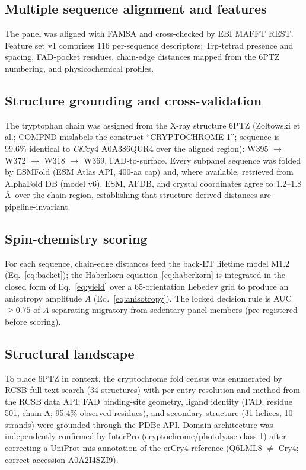 \documentclass[12pt,a4paper]{article}
\begin{document}
\subsection{Multiple sequence alignment and features}
The panel was aligned with FAMSA and cross-checked by EBI MAFFT REST. Feature set v1 comprises 116 per-sequence descriptors: Trp-tetrad presence and spacing, FAD-pocket residues, chain-edge distances mapped from the 6PTZ numbering, and physicochemical profiles.

\subsection{Structure grounding and cross-validation}
The tryptophan chain was assigned from the X-ray structure 6PTZ (Zoltowski et al.; COMPND mislabels the construct ``CRYPTOCHROME-1''; sequence is 99.6\% identical to \emph{Cl}Cry4 A0A386QUR4 over the aligned region): W395 $\rightarrow$ W372 $\rightarrow$ W318 $\rightarrow$ W369, FAD-to-surface. Every subpanel sequence was folded by ESMFold (ESM Atlas API, 400-aa cap) and, where available, retrieved from AlphaFold DB (model v6). ESM, AFDB, and crystal coordinates agree to 1.2--1.8\,\AA\ over the chain region, establishing that structure-derived distances are pipeline-invariant.

\subsection{Spin-chemistry scoring}
For each sequence, chain-edge distances feed the back-ET lifetime model M1.2 (Eq.~\eqref{eq:backet}); the Haberkorn equation~\eqref{eq:haberkorn} is integrated in the closed form of Eq.~\eqref{eq:yield} over a 65-orientation Lebedev grid to produce an anisotropy amplitude $A$ (Eq.~\eqref{eq:anisotropy}). The locked decision rule is AUC $\geq 0.75$ of $A$ separating migratory from sedentary panel members (pre-registered before scoring).

\subsection{Structural landscape}
To place 6PTZ in context, the cryptochrome fold census was enumerated by RCSB full-text search (34 structures) with per-entry resolution and method from the RCSB data API; FAD binding-site geometry, ligand identity (FAD, residue 501, chain A; 95.4\% observed residues), and secondary structure (31 helices, 10 strands) were grounded through the PDBe API. Domain architecture was independently confirmed by InterPro (cryptochrome/photolyase class-1) after correcting a UniProt mis-annotation of the erCry4 reference (Q6LML8 $\neq$ Cry4; correct accession A0A2I4SZI9).
\end{document}
